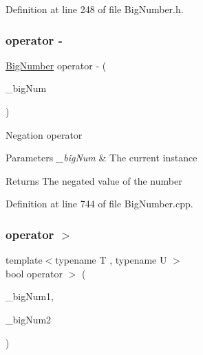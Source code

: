 Definition at line 248 of file Big\+Number.\+h.

\mbox{\label{class_big_nums_1_1_big_number_aa1017a29d47606c15545ea481c1f5dbf}} 
\subsubsection{\texorpdfstring{operator -\/}{operator -}\hspace{0.1cm}{\footnotesize\ttfamily [3/3]}}
{\footnotesize\ttfamily \mbox{\hyperlink{class_big_nums_1_1_big_number}{Big\+Number}} operator -\/ (\begin{DoxyParamCaption}\item[{const \mbox{\hyperlink{class_big_nums_1_1_big_number}{Big\+Number}} \&}]{\+\_\+big\+Num }\end{DoxyParamCaption})\hspace{0.3cm}{\ttfamily [friend]}}

Negation operator 
\begin{DoxyParams}{Parameters}
{\em \+\_\+big\+Num} & The current instance \\
\hline
\end{DoxyParams}
\begin{DoxyReturn}{Returns}
The negated value of the number 
\end{DoxyReturn}


Definition at line 744 of file Big\+Number.\+cpp.

\mbox{\label{class_big_nums_1_1_big_number_a2333d6e7a2438bcea0672fb4dbfc7b91}} 
\subsubsection{\texorpdfstring{operator $>$}{operator >}}
{\footnotesize\ttfamily template$<$typename T , typename U $>$ \\
bool operator $>$ (\begin{DoxyParamCaption}\item[{const T \&}]{\+\_\+big\+Num1,  }\item[{const U \&}]{\+\_\+big\+Num2 }\end{DoxyParamCaption})\hspace{0.3cm}{\ttfamily [friend]}}



